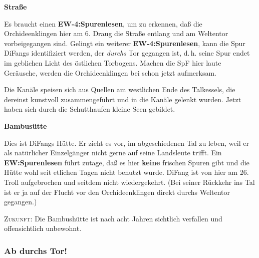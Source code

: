 \documentclass[
a4paper,
twoside,
DIV=calc,
BCOR=4mm,
fontsize=9pt,
twocolumn=on,
titlepage=on,
parskip=half
]{scrartcl}
\begin{document}
\textbf{ Straße}


Es braucht einen \textbf{EW-4:Spurenlesen}, um zu erkennen, daß die
Orchideenklingen hier am 6. Draug die Straße entlang und am Weltentor
vorbeigegangen sind. Gelingt ein weiterer \textbf{EW-4:Spurenlesen},
kann die Spur DiFangs identifiziert werden, der \emph{durchs} Tor
gegangen ist, d.\,h. seine Spur endet im geblichen Licht des östlichen
Torbogens. Machen die SpF hier laute Geräusche, werden die Orchideenklingen
bei  schon jetzt aufmerksam.

Die Kanäle speisen sich aus Quellen am westlichen Ende des Talkessels,
die dereinst kunstvoll zusammengeführt und in die Kanäle gelenkt
wurden. Jetzt haben sich durch die Schutthaufen kleine Seen gebildet.

\textbf{ Bambusütte}


Dies ist DiFangs Hütte. Er zieht es vor, im abgeschiedenen Tal zu
leben, weil er als natürlicher Einzelgänger nicht gerne auf seine
Landsleute trifft. Ein \textbf{EW:Spurenlesen} führt zutage, daß es
hier \textbf{keine} frischen Spuren gibt und die Hütte wohl seit
etlichen Tagen nicht benutzt wurde. DiFang ist von hier am 26. Troll
aufgebrochen und seitdem nicht wiedergekehrt. (Bei seiner Rückkehr ins
Tal ist er ja auf der Flucht vor den Orchideenklingen direkt durchs
Weltentor gegangen.)

\textsc{Zukunft:} Die Bambushütte ist nach acht Jahren sichtlich
verfallen und offensichtlich unbewohnt.

\subsubsection{Ab durchs Tor!}
\end{document}
